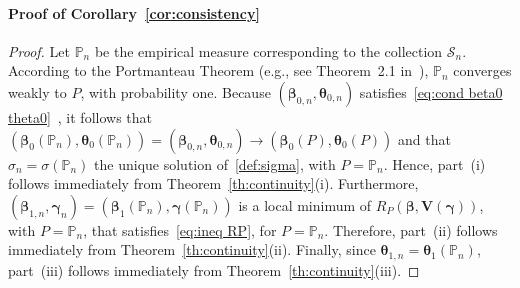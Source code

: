 \documentclass{article}
\numberwithin{equation}{section}
\theoremstyle{plain}
\newcommand{\bbeta}{\bm\beta}
\newcommand{\btheta}{\bm\theta}
\newcommand{\bgamma}{\bm\gamma}
\newcommand{\bV}{\mathbf{V}}
\begin{document}
\paragraph*{Proof of Corollary~\ref{cor:consistency}}
\begin{proof}
Let $\mathbb{P}_n$ be the empirical measure corresponding to the collection $\mathcal{S}_n$.
According to the Portmanteau Theorem (e.g., see Theorem~2.1 in~\cite{billingsley1968}),
$\mathbb{P}_n$ converges weakly to $P$, with probability one.
Because $(\bbeta_{0,n},\btheta_{0,n})$ satisfies~\eqref{eq:cond beta0 theta0}~,
it follows that $(\bbeta_0(\mathbb{P}_n),\btheta_0(\mathbb{P}_n))=(\bbeta_{0,n},\btheta_{0,n})\to (\bbeta_0(P),\btheta_0(P))$
and that $\sigma_n=\sigma(\mathbb{P}_n)$ the unique solution of~\eqref{def:sigma}, with $P=\mathbb{P}_n$.
Hence, part~(i) follows immediately from Theorem~\ref{th:continuity}(i).
Furthermore, $(\bbeta_{1,n},\bgamma_n)=(\bbeta_1(\mathbb{P}_n),\bgamma(\mathbb{P}_n))$
is a local minimum of $R_P(\bbeta,\bV(\bgamma))$, with $P=\mathbb{P}_n$,
that satisfies~\eqref{eq:ineq RP}, for $P=\mathbb{P}_n$.
Therefore, part~(ii) follows immediately from Theorem~\ref{th:continuity}(ii).
Finally, since $\btheta_{1,n}=\btheta_1(\mathbb{P}_n)$,
part~(iii) follows immediately from Theorem~\ref{th:continuity}(iii).
\end{proof}
\end{document}
